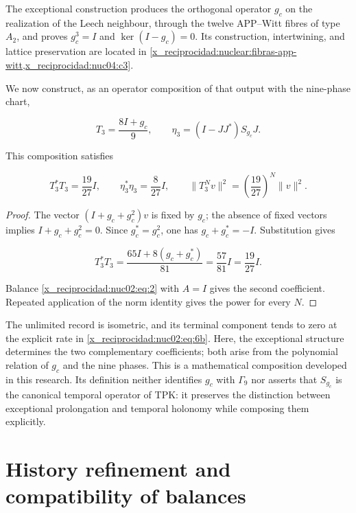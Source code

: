 The exceptional construction produces the orthogonal operator \(g_c\) on the realization of the Leech neighbour, through the twelve APP–Witt fibres of type \(A_2\), and proves \(g_c^3=I\) and \(\ker(I-g_c)=0\). Its construction, intertwining, and lattice preservation are located in \cref{x_reciprocidad:nuclear:fibras-app-witt,x_reciprocidad:nuc04:c3}.

We now construct, as an operator composition of that output with the nine-phase chart,

\[
T_3=\frac{8I+g_c}{9},\qquad
\eta_3=(I-JJ^*)S_{g_c}J.
\]

\begin{corollary}
This composition satisfies

\begin{equation}
\boxed{T_3^*T_3=\frac{19}{27}I,\qquad
\eta_3^*\eta_3=\frac8{27}I,\qquad
\|T_3^Nv\|^2=\left(\frac{19}{27}\right)^N\|v\|^2.}\label{x_reciprocidad:nuc02:eq:6b}
\end{equation}
\end{corollary}

\begin{proof}
The vector \((I+g_c+g_c^2)v\) is fixed by \(g_c\); the absence of fixed vectors implies \(I+g_c+g_c^2=0\). Since \(g_c^*=g_c^2\), one has \(g_c+g_c^*=-I\). Substitution gives

\[
T_3^*T_3=\frac{65I+8(g_c+g_c^*)}{81}
=\frac{57}{81}I=\frac{19}{27}I.
\]

Balance \eqref{x_reciprocidad:nuc02:eq:2} with \(A=I\) gives the second coefficient. Repeated application of the norm identity gives the power for every \(N\).
\end{proof}

The unlimited record is isometric, and its terminal component tends to zero at the explicit rate in \eqref{x_reciprocidad:nuc02:eq:6b}. Here, the exceptional structure determines the two complementary coefficients; both arise from the polynomial relation of \(g_c\) and the nine phases. This is a mathematical composition developed in this research. Its definition neither identifies \(g_c\) with \(\Gamma_9\) nor asserts that \(S_{g_c}\) is the canonical temporal operator of TPK: it preserves the distinction between exceptional prolongation and temporal holonomy while composing them explicitly.

\section{History refinement and compatibility of balances}

